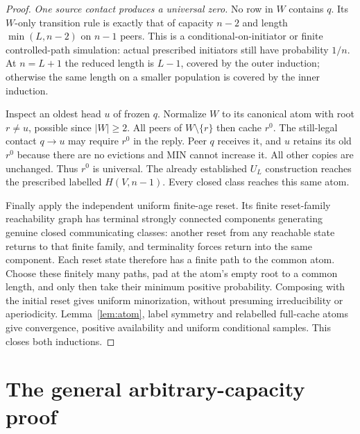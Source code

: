 \documentclass[11pt]{article}
\begin{document}
\begin{proof}
\emph{One source contact produces a universal zero.}
No row in $W$ contains $q$. Its $W$-only transition rule is exactly
that of capacity $n-2$ and length $\min(L,n-2)$ on $n-1$ peers.
This is a conditional-on-initiator or finite controlled-path
simulation: actual prescribed initiators still have probability
$1/n$. At $n=L+1$ the reduced length is $L-1$, covered by the
outer induction; otherwise the same length on a smaller population
is covered by the inner induction.

Inspect an oldest head $u$ of frozen $q$. Normalize $W$ to its
canonical atom with root $r\ne u$, possible since $|W|\ge2$.
All peers of $W\setminus\{r\}$ then cache $r^0$.
The still-legal contact $q\to u$ may require $r^0$ in the reply.
Peer $q$ receives it, and $u$ retains its old $r^0$ because there
are no evictions and MIN cannot increase it. All other copies
are unchanged. Thus $r^0$ is universal. The already established
$U_L$ construction reaches the prescribed labelled $H(V,n-1)$.
Every closed class reaches this same atom.

Finally apply the independent uniform finite-age reset.
Its finite reset-family reachability graph has terminal strongly
connected components generating genuine closed communicating
classes: another reset from any reachable state returns to that
finite family, and terminality forces return into the same
component. Each reset state therefore has a finite path to the
common atom. Choose these finitely many paths, pad at the atom's
empty root to a common length, and only then take their minimum
positive probability. Composing with the initial reset gives
uniform minorization, without presuming irreducibility or
aperiodicity. Lemma~\ref{lem:atom}, label symmetry and relabelled
full-cache atoms give convergence, positive availability and
uniform conditional samples. This closes both inductions.
\end{proof}

\section{The general arbitrary-capacity proof}
\end{document}
